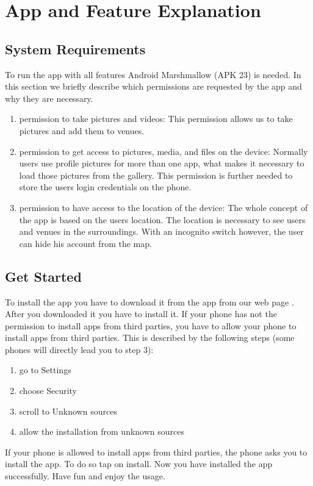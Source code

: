 \documentclass[11pt, accentcolor=tud1c]{tudreport}
\begin{document}
\chapter{App and Feature Explanation}\label{ch:app_and_feature_explanation}

\section{System Requirements}\label{sec:system_requirements}
To run the app with all features Android Marshmallow (APK 23) is needed. 
In this section we briefly describe which permissions are requested by the app and why they are necessary.
\begin{enumerate}
\item permission to take pictures and videos: This permission allows us to take pictures and add them to venues.
\item permission to get access to pictures, media, and files on the device: Normally users use profile pictures for more than one app, what makes it necessary to load those pictures from the gallery. This permission is further needed to store the users login credentials on the phone.
\item permission to have access to the location of the device: The whole concept of the app is based on the users location. The location is necessary to see users and venues in the surroundings. With an incognito switch however, the user can hide his account from the map.
\end{enumerate}

\section{Get Started}
To install the app you have to download it from the app from our web page \cite{app}. After you downloaded it you have to install it. If your phone has not the permission to install apps from third parties, you have to allow your phone to install apps from third parties. This is described by the following steps (some phones will directly lead you to step 3):
\begin{enumerate}
\item go to Settings
\item choose Security
\item scroll to Unknown sources
\item allow the installation from unknown sources
\end{enumerate} 
If your phone is allowed to install apps from third parties, the phone asks you to install the app. To do so tap on install. Now you have installed the app successfully. Have fun and enjoy the usage.
\end{document}
